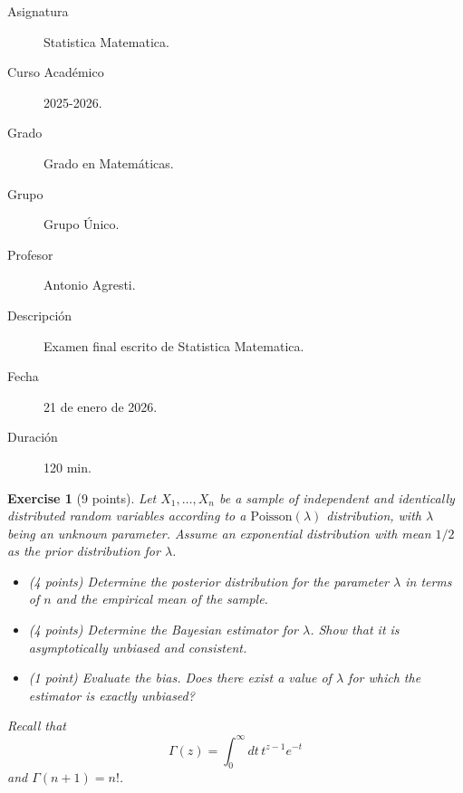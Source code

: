 \documentclass[12pt]{article}
\newcommand{\nameEjercicio}{Exercise}
\newtheorem{ejercicio}{\nameEjercicio} [section]     %
\begin{document}

    
	

    \begin{description}
        \item[Asignatura] Statistica Matematica.
        \item[Curso Académico] 2025-2026.
        \item[Grado] Grado en Matemáticas.
        \item[Grupo] Grupo Único.
        \item[Profesor] Antonio Agresti.
        \item[Descripción] Examen final escrito de Statistica Matematica.
        \item[Fecha] 21 de enero de 2026.
        \item[Duración] 120 min.
    
    \end{description}
    \newpage

    
    \begin{ejercicio}[9 points]
        Let $X_1, \dots, X_n$ be a sample of independent and identically distributed random variables according to a $\text{Poisson}(\lambda)$ distribution, with $\lambda$ being an unknown parameter. Assume an exponential distribution with mean $1/2$ as the prior distribution for $\lambda$.
        \begin{itemize}
            \item (4 points) Determine the posterior distribution for the parameter $\lambda$ in terms of $n$ and the empirical mean of the sample.
            \item (4 points) Determine the Bayesian estimator for $\lambda$. Show that it is asymptotically unbiased and consistent.
            \item (1 point) Evaluate the bias. Does there exist a value of $\lambda$ for which the estimator is exactly unbiased?
        \end{itemize}
    Recall that 
    $$\Gamma(z) = \int_0^\infty dt \, t^{z-1} e^{-t}$$ 
    and $\Gamma(n+1) = n!$.

    \end{ejercicio}
\end{document}
